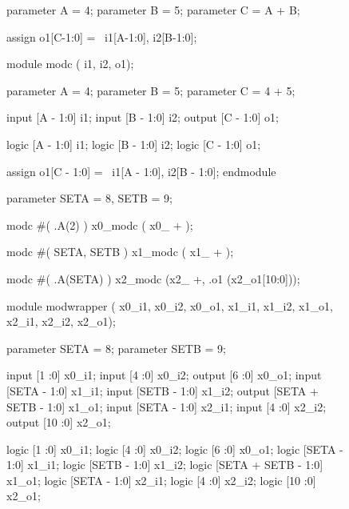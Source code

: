 \begin{figure}[ptb]
  \begin{minipage}[t]{.48\textwidth}
    \begin{mhdle}[caption={Inner module: \texttt{modc} in \gls{mhdl}}, label={lst:modc in mhdl}]
parameter A = 4;
parameter B = 5; 
parameter C = A + B;

assign o1[C-1:0] = {~i1[A-1:0], i2[B-1:0]};
    \end{mhdle}
    \begin{mhdle}[caption={Generated \texttt{modc} in SystemVerilog}, label={lst:modc in sv}]
module modc (
  i1, 
  i2, 
  o1);

parameter A = 4;
parameter B = 5;
parameter C = 4 + 5;

input [A - 1:0] i1;
input [B - 1:0] i2;
output [C - 1:0] o1;

logic [A - 1:0] i1;
logic [B - 1:0] i2;
logic [C - 1:0] o1;

assign o1[C - 1:0] = {~i1[A - 1:0], i2[B - 1:0]};
endmodule
    \end{mhdle}
    \begin{mhdle}[caption={Wrapper Module in MetaHDL}, label={lst:wrapper in mhdl}]
parameter SETA = 8,
          SETB = 9;


modc #( .A(2) ) x0_modc ( x0_ + );

modc #( SETA, SETB ) x1_modc ( x1_ + );

modc #( .A(SETA) ) x2_modc (x2_ +,
                           .o1 (x2_o1[10:0]));
    \end{mhdle}
  \end{minipage}
  \hfill
  \begin{minipage}[t]{.48\textwidth}
    \begin{mhdle}[caption={Generated wrapper module in SystemVerilog}, label={lst:wrapper in sv}]
module modwrapper (
  x0_i1, 
  x0_i2, 
  x0_o1, 
  x1_i1, 
  x1_i2, 
  x1_o1, 
  x2_i1, 
  x2_i2, 
  x2_o1);

parameter SETA = 8;
parameter SETB = 9;

input   [1   :0]  x0_i1;
input   [4   :0]  x0_i2;
output  [6   :0]  x0_o1;
input   [SETA - 1:0]  x1_i1;
input   [SETB - 1:0]  x1_i2;
output  [SETA + SETB - 1:0]  x1_o1;
input   [SETA - 1:0]  x2_i1;
input   [4   :0]  x2_i2;
output  [10  :0]  x2_o1;

logic   [1   :0]  x0_i1;
logic   [4   :0]  x0_i2;
logic   [6   :0]  x0_o1;
logic   [SETA - 1:0]  x1_i1;
logic   [SETB - 1:0]  x1_i2;
logic   [SETA + SETB - 1:0]  x1_o1;
logic   [SETA - 1:0]  x2_i1;
logic   [4   :0]  x2_i2;
logic   [10  :0]  x2_o1;


\end{mhdle}
\end{minipage}
\end{figure}
